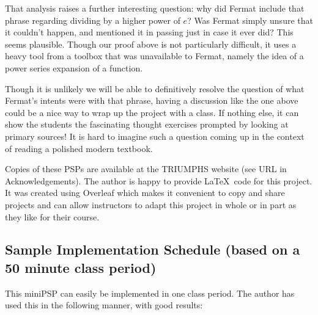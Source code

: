 That analysis raises a further interesting question: why did Fermat
include that phrase regarding dividing by a higher power of $e$?  Was
Fermat simply unsure that it couldn't happen, and mentioned it in
passing just in case it ever did?  This seems plausible. Though our
proof above is not particularly difficult, it uses a heavy tool from a
toolbox that was unavailable to Fermat, namely the idea of a power
series expansion of a function.

Though it is unlikely we will be able to definitively resolve the
question of what Fermat's intents were with that phrase, having a
discussion like the one above could be a nice way to wrap up the
project with a class.  If nothing else, it can show the students the
fascinating thought exercises prompted by looking at primary sources!
It is hard to imagine such a question coming up in the context of
reading a polished modern textbook.

Copies of these PSPs are available at the TRIUMPHS website (see URL in
Acknowledgements).  The author is happy to provide \LaTeX\ code for
this project.  It was created using Overleaf which makes it convenient
to copy and share projects and can allow instructors to adapt this
project in whole or in part as they like for their course.


\subsection*{Sample Implementation Schedule (based on a 50 minute class period)}

This miniPSP can easily be implemented in one class period.  The
author has used this in the following manner, with good results:

